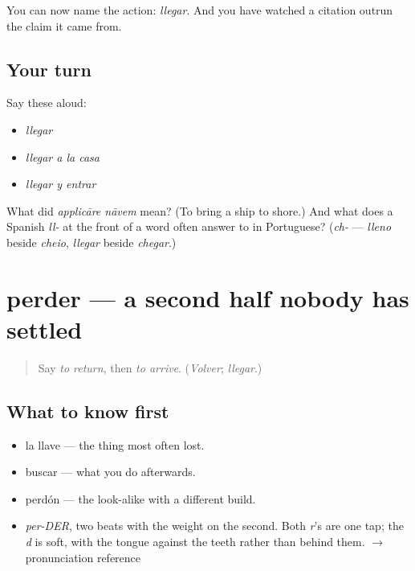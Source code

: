\begin{grammarlens}[title={What you've built}]
You can now name the action: \emph{llegar}. And you have watched a citation outrun the claim it came from.
\end{grammarlens}

\subsection*{Your turn}
Say these aloud:

\begin{itemize}
\raggedright
  \item \emph{llegar}
  \item \emph{llegar a la casa}
  \item \emph{llegar y entrar}
\end{itemize}

\begin{tcolorbox}[breakable,colback=teal!4,colframe=teal!35!black,title={Before you move on}]
What did \emph{applicāre nāvem} mean? (To bring a ship to shore.) And what does a Spanish \emph{ll-} at the front of a word often answer to in Portuguese? (\emph{ch-} — \emph{lleno} beside \emph{cheio}, \emph{llegar} beside \emph{chegar}.)
\end{tcolorbox}
\section[perder]{perder — a second half nobody has settled}

\label{lesson:ES-C395-perder}



\begin{quote}
Say \emph{to return}, then \emph{to arrive}. (\emph{Volver}; \emph{llegar}.)
\end{quote}

\subsection*{What to know first}
\begin{itemize}
\raggedright
  \item la llave — the thing most often lost.
  \item buscar — what you do afterwards.
  \item perdón — the look-alike with a different build.
\end{itemize}

\begin{sounds}
\begin{itemize}
\raggedright
  \item \emph{per-DER}, two beats with the weight on the second. Both \emph{r}'s are one tap; the \emph{d} is soft, with the tongue against the teeth rather than behind them. $\to$ pronunciation reference
\end{itemize}
\end{sounds}

